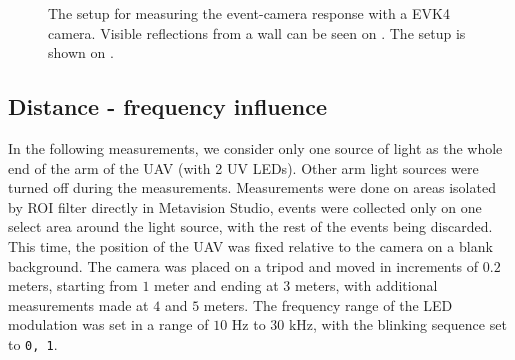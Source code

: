 \begin{figure}[H]
	\centering
	\caption{
  The setup for measuring the event-camera response with a EVK4 camera. Visible reflections from a wall can be seen on . The setup is shown on .
  }
	\label{fig:meas1}
\end{figure}


\subsection{Distance - frequency influence}

In the following measurements, we consider only one source of light as the whole end of the arm of the UAV (with 2 UV LEDs). Other arm light sources were turned off during the measurements.
Measurements were done on areas isolated by ROI filter directly in Metavision Studio, events were collected only on one select area around the light source, with the
rest of the events being discarded.
This time, the position of the UAV was fixed relative to the camera on a blank background. The camera was placed on a tripod
and moved in increments of $0.2$ meters, starting from $1$ meter and ending at $3$ meters, with additional measurements made
at $4$ and $5$ meters.
The frequency range of the LED modulation was set in a range of $10$ Hz to $30$ kHz, with the blinking sequence set to \texttt{0, 1}.

